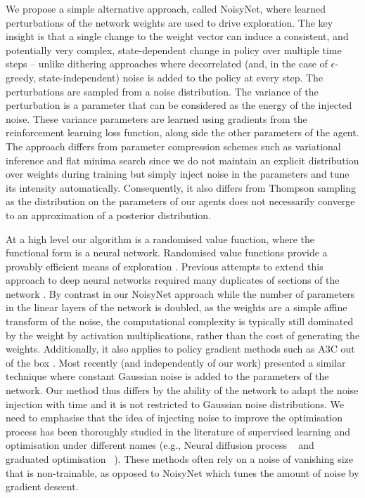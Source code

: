 \documentclass{article}
\newcommand{\algoinit}{NoisyNet}
\begin{document}
We propose a simple alternative approach, called \algoinit{}, where learned perturbations of the network weights are used to drive exploration.
The key insight is that a single change to the weight vector can induce a consistent, and potentially very complex, state-dependent change in policy over multiple time steps -- unlike dithering approaches where decorrelated (and, in the case of  $\epsilon$-greedy, state-independent) noise is added to the policy at every step.
The perturbations are sampled from a noise distribution.
The variance of the perturbation is a parameter that can be considered as the energy of the injected noise.
These variance parameters are learned using gradients from the reinforcement learning loss function, along side the other parameters of the agent.
The approach differs from parameter compression schemes such as variational inference \citep{hinton1993keeping,bishop1995training,graves2011practical,blundell2015weight,gal16} and flat minima search \citep{hochreiter1997flat} since we do not maintain an explicit distribution over weights during training but simply inject noise in the parameters and tune its intensity automatically. Consequently, it also differs from Thompson sampling \citep{thompson1933likelihood,lipton2016efficient} as the distribution on the parameters of our agents does not necessarily converge to an approximation of a posterior distribution.


At a high level our algorithm is a randomised value function, where the functional form is a neural network. Randomised value functions provide a provably efficient means of exploration \citep{osband2014generalization}. Previous attempts to extend this approach to deep neural networks required many duplicates of sections of the network \citep{osband2016deep}.
By contrast in our \algoinit{} approach while the number of parameters in the linear layers of the network is doubled, as the weights are a simple affine transform of the noise, the computational complexity is typically still dominated by the weight by activation multiplications, rather than the cost of generating the weights. Additionally, it also applies to policy gradient methods such as A3C out of the box \citep{mnih2016asynchronous}.
Most recently (and independently of our work) \citet{plappert2017parameter} presented a similar technique where constant Gaussian noise is added to the parameters of the network. Our method thus differs by the ability of the network to adapt the noise injection with time and it is not restricted to Gaussian noise distributions. We need to emphasise that the idea of injecting noise to improve the optimisation process has been thoroughly studied in the literature of supervised learning and optimisation under different names (e.g., Neural diffusion process ~\citep{mobahi2016training} and graduated optimisation  ~\citep{hazan2016graduated}). These methods often rely on a noise of vanishing size that is non-trainable, as opposed to NoisyNet which tunes the amount of noise by gradient descent. 
\end{document}
